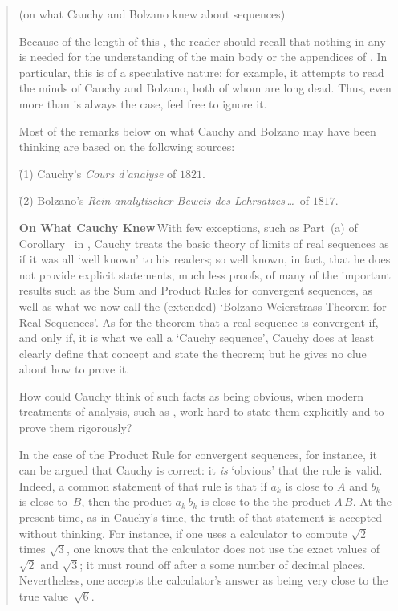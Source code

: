 \begin{quotation}
{\footnotesize \underline{\Note} (on what Cauchy and Bolzano knew about sequences)

\V

        Because of the length of this {\Note}, the reader should recall that nothing in any
    {\Note} is needed for the understanding of the main body or the appendices of {\ThisText}. 
    In particular, this {\Note} is of a speculative nature; for example, it attempts to read the minds of Cauchy and Bolzano, both of whom are long dead.
    Thus, even more than is always the case, feel free to ignore it.

        Most of the remarks below on what Cauchy and Bolzano may have been thinking are based on the following sources:

        \h (1) Cauchy's {\em Cours d'analyse} of $1821$.

        \h (2) Bolzano's {\em Rein analytischer Beweis des Lehrsatzes\,{\ldots}\,} of $1817$.

\V

        {\bf On What Cauchy Knew}\,With few exceptions, such as Part~(a) of Corollary~ in {\ThisText},
    Cauchy treats the basic theory of limits of real sequences as if it was all `well known' to his readers;
    so well known, in fact, that he does not provide explicit statements, much less proofs,
    of many of the important results such as the Sum and Product Rules for convergent sequences,
    as well as what we now call the (extended) `Bolzano-Weierstrass Theorem for Real Sequences'.
    As for the theorem that a real sequence is convergent if, and only if, it is what we call a `Cauchy sequence',
    Cauchy does at least clearly define that concept and state the theorem; but he gives no clue about how to prove it.

        How could Cauchy think of such facts as being obvious, when modern treatments of analysis,
    such as {\ThisText}, work hard to state them explicitly and to prove them rigorously?

        In the case of the Product Rule for convergent sequences, for instance, it can be argued that Cauchy is correct:
    it {\em is} `obvious' that the rule is valid. Indeed, a common statement of that rule
    is that if $a_{k}$ is close to $A$ and $b_{k}$ is close to~$B$, then the product $a_{k}\,b_{k}$ is close to the the product $A\,B$.
    At the present time, as in Cauchy's time, the truth of that statement is accepted without thinking.
    For instance, if one uses a calculator to compute $\sqrt{2}$ times $\sqrt{3}$,
    one knows that the calculator does not use the exact values of $\sqrt{2}$ and $\sqrt{3}$; it must round off after a some number of decimal places.
    Nevertheless, one accepts the calculator's answer as being very close to the true value~$\sqrt{6}$.

}
\end{quotation}
